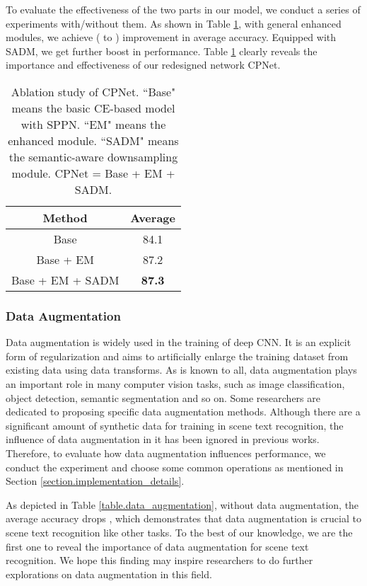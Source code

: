 \documentclass[final]{cvpr}
\begin{document}
To evaluate the effectiveness of the two parts in our model, we conduct a series of experiments with/without them. As shown in Table \ref{table.model_redesign}, with general enhanced modules, we achieve  ( to ) improvement in average accuracy. Equipped with SADM, we get further boost in performance. Table \ref{table.model_redesign} clearly reveals the importance and effectiveness of our redesigned network CPNet.


\begin{table}[ht]
    \caption{Ablation study of CPNet. ``Base" means the basic CE-based model with SPPN.
    ``EM" means the enhanced module. ``SADM" means the semantic-aware downsampling module. CPNet = Base + EM + SADM.}
    \label{table.model_redesign}
	\centering
	\begin{tabular}{ | c | c |}
		\hline
		 	Method & Average \\ 
		\hline
		Base & 84.1 \\
		\hline
		Base + EM & 87.2 \\
		\hline
		Base + EM + SADM & \textbf{87.3}\\
		\hline
	\end{tabular}
\end{table}

\subsubsection{Data Augmentation}
Data augmentation is widely used in the training of deep CNN. It is an explicit form of regularization and aims to artificially enlarge the training dataset from existing data using data transforms. As is known to all, data augmentation plays an important role in many computer vision tasks, such as image classification, object detection, semantic segmentation and so on. Some researchers are dedicated to proposing specific data augmentation methods. Although there are a significant amount of synthetic data for training in scene text recognition, the influence of data augmentation in it has been ignored in previous works. Therefore, to evaluate how data augmentation influences performance, we conduct the experiment and choose some common operations as mentioned in Section \ref{section.implementation_details}. 

As depicted in Table \ref{table.data_augmentation}, without data augmentation, the average accuracy drops , which demonstrates that data augmentation is crucial to scene text recognition like other tasks. To the best of our knowledge, we are the first one to reveal the importance of data augmentation for scene text recognition. We hope this finding may inspire researchers to do further explorations on data augmentation in this field.
\end{document}
